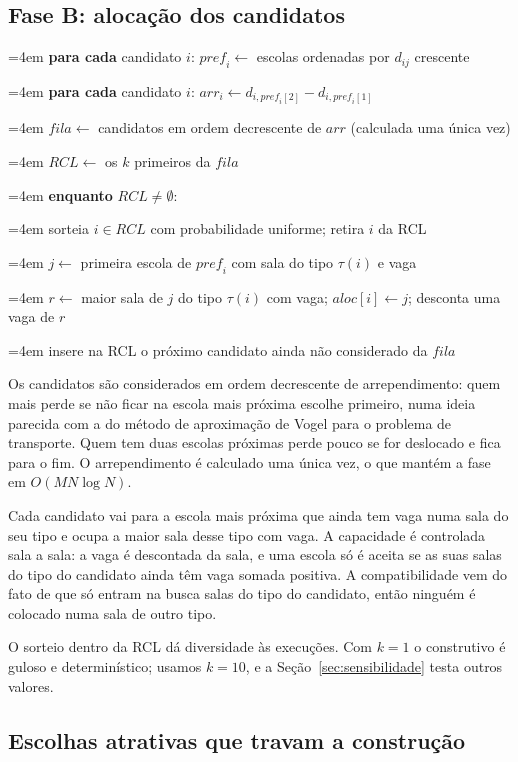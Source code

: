 \documentclass[12pt]{article}
\newcommand{\linha}[1]{\par\noindent\hangindent=4em\hangafter=1\makebox[1.4em][r]{\scriptsize #1}\hspace{0.6em}}
\begin{document}
\subsection{Fase B: alocação dos candidatos}

\begin{algoritmo}[htbp]
  \caption{Fase B: alocação por arrependimento estático com RCL.}\label{alg:faseB}
  \small
  \linha{1} \textbf{para cada} candidato $i$: $\mathit{pref}_i \gets$ escolas ordenadas por $d_{ij}$
    crescente
  \linha{2} \textbf{para cada} candidato $i$: $\mathit{arr}_i \gets d_{i,\mathit{pref}_i[2]} -
    d_{i,\mathit{pref}_i[1]}$
  \linha{3} $\mathit{fila} \gets$ candidatos em ordem decrescente de $\mathit{arr}$ (calculada uma
    única vez)
  \linha{4} $\mathit{RCL} \gets$ os $k$ primeiros da $\mathit{fila}$
  \linha{5} \textbf{enquanto} $\mathit{RCL} \ne \emptyset$:
  \linha{6} \quad sorteia $i \in \mathit{RCL}$ com probabilidade uniforme; retira $i$ da RCL
  \linha{7} \quad $j \gets$ primeira escola de $\mathit{pref}_i$ com sala do tipo $\tau(i)$ e vaga
  \linha{8} \quad $r \gets$ maior sala de $j$ do tipo $\tau(i)$ com vaga; $\mathit{aloc}[i] \gets
    j$; desconta uma vaga de $r$
  \linha{9} \quad insere na RCL o próximo candidato ainda não considerado da $\mathit{fila}$
\end{algoritmo}

Os candidatos são considerados em ordem decrescente de arrependimento: quem mais perde se não
ficar na escola mais próxima escolhe primeiro, numa ideia parecida com a do método de aproximação
de Vogel para o problema de transporte. Quem tem duas escolas próximas perde pouco se for
deslocado e fica para o fim. O arrependimento é calculado uma única vez, o que mantém a fase em
$O(MN \log N)$.

Cada candidato vai para a escola mais próxima que ainda tem vaga numa sala do seu tipo e ocupa a
maior sala desse tipo com vaga. A capacidade é controlada sala a sala: a vaga é descontada da sala,
e uma escola só é aceita se as suas salas do tipo do candidato ainda têm vaga somada positiva. A
compatibilidade vem do fato de que só entram na busca salas do tipo do candidato, então ninguém é
colocado numa sala de outro tipo.

O sorteio dentro da RCL dá diversidade às execuções. Com $k = 1$ o construtivo é guloso e
determinístico; usamos $k = 10$, e a Seção~\ref{sec:sensibilidade} testa outros valores.

\subsection{Escolhas atrativas que travam a construção}\label{sec:trava}
\end{document}
